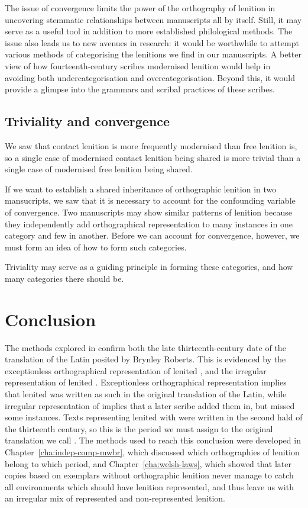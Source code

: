 The issue of convergence  limits the power of the orthography of lenition in uncovering stemmatic relationships between manuscripts all by itself. Still, it may serve as a useful tool in addition to more established philological methods. The issue also leads us to new avenues in research: it would be worthwhile to attempt various methods of categorising the lenitions we find in our manuscripts. A better view of how fourteenth-century scribes modernised lenition would help in avoiding both undercategorisation and overcategorisation. Beyond this, it would provide a glimpse into the grammars and scribal practices of these scribes.



\subsection{Triviality and convergence}
\label{sec:triv-conv}

We saw that contact lenition is more frequently modernised than free lenition is, so a single case of modernised contact lenition being shared is more trivial than a single case of modernised free lenition being shared. 

If we want to establish a shared inheritance of orthographic lenition in two mansucripts, we saw that it is necessary to account for the confounding variable of convergence. Two manuscripts may show similar patterns of lenition because they independently add orthographical representation to many instances in one category and few in another. Before we can account for convergence, however, we must form an idea of how to form such categories.

Triviality may serve as a guiding principle in forming these categories, and how many categories there should be.

\section{Conclusion}
\label{sec:dewi-conclusion}

The methods explored in confirm both the late thirteenth-century date of the translation of the Latin  posited by Brynley Roberts. This is evidenced by the exceptionless orthographical representation of lenited , and the irregular representation of lenited . Exceptionless orthographical representation implies that lenited  was written as such in the original translation of the Latin, while irregular representation of  implies that a later scribe added them in, but missed some instances. Texts representing lenited  with  were written in the second hald of the thirteenth century, so this is the period we must assign to the original translation we call . The methods used to reach this conclusion were developed in Chapter~\ref{cha:indep-comp-mwbr}, which discussed which orthographies of lenition belong to which period, and Chapter~\ref{cha:welsh-laws}, which showed that later copies based on exemplars without orthographic lenition never manage to catch all environments which should have lenition represented, and thus leave us with an irregular mix of represented and non-represented lenition.

